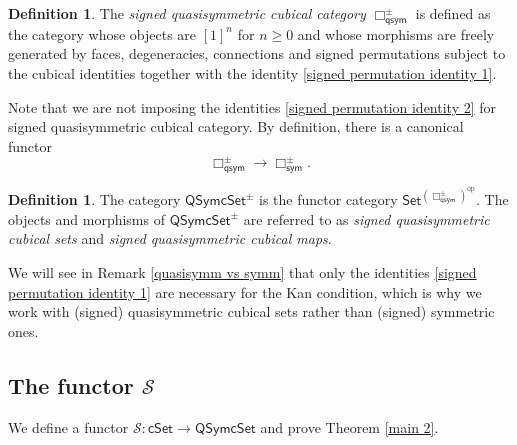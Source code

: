 \documentclass[oneside, 12pt]{amsart}
\numberwithin{equation}{section}
\theoremstyle{plain}
\theoremstyle{definition}
\newtheorem{definition}[theorem]{Definition}
\theoremstyle{remark}
\newcommand{\cSet}{\mathsf{cSet}}
\newcommand{\QSymcSet}{\mathsf{QSymcSet}}
\begin{document}
	
	
	\begin{definition}
		The \emph{signed quasisymmetric cubical category} $\Box_\mathsf{qsym}^\pm$ is defined as the category whose objects are $[1]^n$ for $n\ge 0$ and whose morphisms are freely generated by faces, degeneracies, connections and signed permutations subject to the cubical identities together with the identity \eqref{signed permutation identity 1}.
	\end{definition}
	
	
	
	Note that we are not imposing the identities \eqref{signed permutation identity 2} for signed quasisymmetric cubical category. By definition, there is a canonical functor
	\[
	\Box_\mathsf{qsym}^\pm\to\Box_\mathsf{sym}^\pm.
	\]
	
	
	
	\begin{definition}
		The category $\QSymcSet^\pm$ is the functor category $\mathsf{Set}^{(\Box_\mathsf{qsym}^\pm)^\mathrm{op}}$. The objects and morphisms of $\QSymcSet^\pm$ are referred to as \emph{signed quasisymmetric cubical sets} and \emph{signed quasisymmetric cubical maps}.
	\end{definition}
	We will see in Remark \ref{quasisymm vs symm} that only the identities \eqref{signed permutation identity 1} are necessary for the Kan condition, which is why we work with (signed) quasisymmetric cubical sets rather than (signed) symmetric ones.
	
	
	\subsection{The functor $\mathcal{S}$}
	
	We define a functor $\mathcal{S}\colon\cSet\to\QSymcSet$ and prove Theorem \ref{main 2}. 
	
	
	
\end{document}
